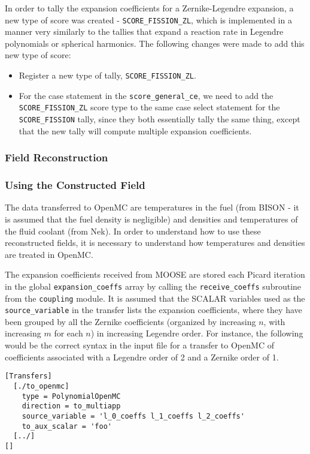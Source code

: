 \documentclass[10pt]{article}
\numberwithin{equation}{section} %
\begin{document}
In order to tally the expansion coefficients for a Zernike-Legendre expansion, a new type of score was created - {\tt SCORE\_FISSION\_ZL}, which is implemented in a manner very similarly to the tallies that expand a reaction rate in Legendre polynomials or spherical harmonics. The following changes were made to add this new type of score:

\begin{itemize}
\item Register a new type of tally, {\tt SCORE\_FISSION\_ZL}. 
\item For the case statement in the {\tt score\_general\_ce}, we need to add the {\tt SCORE\_FISSION\_ZL} score type to the same case select statement for the {\tt SCORE\_FISSION} tally, since they both essentially tally the same thing, except that the new tally will compute multiple expansion coefficients.
\end{itemize}

\subsubsection{Field Reconstruction}

\subsubsection{Using the Constructed Field}
The data transferred to OpenMC are temperatures in the fuel (from BISON - it is assumed that the fuel density is negligible) and densities and temperatures of the fluid coolant (from Nek). In order to understand how to use these reconstructed fields, it is necessary to understand how temperatures and densities are treated in OpenMC.

The expansion coefficients received from MOOSE are stored each Picard iteration in the global {\tt expansion\_coeffs} array by calling the {\tt receive\_coeffs} subroutine from the {\tt coupling} module. It is assumed that the SCALAR variables used as the {\tt source\_variable} in the transfer lists the expansion coefficients, where they have been grouped by all the Zernike coefficients (organized by increasing \(n\), with increasing \(m\) for each \(n\)) in increasing Legendre order. For instance, the following would be the correct syntax in the input file for a transfer to OpenMC of coefficients associated with a Legendre order of 2 and a Zernike order of 1.

\begin{lstlisting}
[Transfers]
  [./to_openmc]
    type = PolynomialOpenMC
    direction = to_multiapp
    source_variable = 'l_0_coeffs l_1_coeffs l_2_coeffs'
    to_aux_scalar = 'foo'
  [../]
[]
\end{lstlisting}
\end{document}
